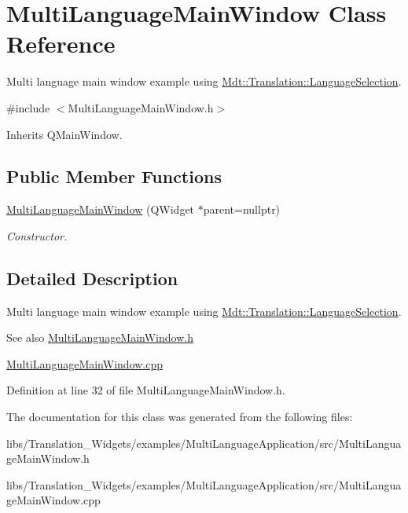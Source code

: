 \hypertarget{class_multi_language_main_window}{}\section{Multi\+Language\+Main\+Window Class Reference}
\label{class_multi_language_main_window}


Multi language main window example using \hyperlink{class_mdt_1_1_translation_1_1_language_selection}{Mdt\+::\+Translation\+::\+Language\+Selection}.  




{\ttfamily \#include $<$Multi\+Language\+Main\+Window.\+h$>$}



Inherits Q\+Main\+Window.

\subsection*{Public Member Functions}
\begin{DoxyCompactItemize}
\item 
\hyperlink{class_multi_language_main_window_acfa2f164ed993066cd96ba747e72bbf7}{Multi\+Language\+Main\+Window} (Q\+Widget $\ast$parent=nullptr)\hypertarget{class_multi_language_main_window_acfa2f164ed993066cd96ba747e72bbf7}{}\label{class_multi_language_main_window_acfa2f164ed993066cd96ba747e72bbf7}

\begin{DoxyCompactList}\small\item\em Constructor. \end{DoxyCompactList}\end{DoxyCompactItemize}


\subsection{Detailed Description}
Multi language main window example using \hyperlink{class_mdt_1_1_translation_1_1_language_selection}{Mdt\+::\+Translation\+::\+Language\+Selection}. 

\begin{DoxySeeAlso}{See also}
\hyperlink{_multi_language_main_window_8h_source}{Multi\+Language\+Main\+Window.\+h} 

\hyperlink{_multi_language_main_window_8cpp_source}{Multi\+Language\+Main\+Window.\+cpp} 
\end{DoxySeeAlso}


Definition at line 32 of file Multi\+Language\+Main\+Window.\+h.



The documentation for this class was generated from the following files\+:\begin{DoxyCompactItemize}
\item 
libs/\+Translation\+\_\+\+Widgets/examples/\+Multi\+Language\+Application/src/Multi\+Language\+Main\+Window.\+h\item 
libs/\+Translation\+\_\+\+Widgets/examples/\+Multi\+Language\+Application/src/Multi\+Language\+Main\+Window.\+cpp\end{DoxyCompactItemize}
